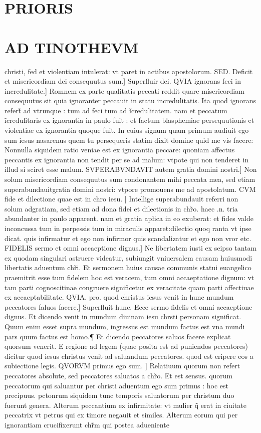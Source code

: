 \documentclass{article}
\begin{document}
\begin{pages}
\section*{PRIORIS }
\section*{AD TINOTHEVM }\pstart christi, fed et violentiam intulerat: vt paret in actibus apostolorum. SED. Deficit et misericordiam dei consequutus sum.] Superfluir dei. QVIA ignorans feci in incredulitate.] Romnem ex parte qualitatis peccati reddit quare misericordiam consequutus sit  quia ignoranter peccauit in statu incredulitatis. Ita quod ignorans refert̃ ad vtrunque  : tum ad feci tum ad ĩcredulitatem. nam et peccatum ĩcredulitaris ex ignorantia in paulo fuit : et factum blasphemiae  persequutionis et violentiae ex ignorantia quoque  fuit. In cuius signum quam primum audiuit ego sum iesus nasarenus quem tu persequeris  statim dixit domine quid me vis facere: Nonnulla siquidem ratio veniae est ex ignorantia peccare: quoniam affectus peccantis ex ignorantia  non tendit per se ad malum: vtpote qui non tenderet in illud si sciret esse malum. SVPERABVNDAVIT autem gratia domini nostri.] Non solum misericordiam consequutus sum condonantem mihi peccata mea, sed etiam superabundauitgratia domini nostri: vtpore promouens me ad apostolatum. CVM fide et dilectione quae est in chro iesu. ] Intellige superabundauit  referri non solum adgratiam, sed etiam ad dona fidei et dilectionis in chr̃o. haec .n. tria abundanter in paulo apparent. nam et gratia apłica in eo exuberat: et fides valde inconcussa tum in perpessis tum in miraculis apparet:dilectio quoq ranta vt ipse dicat. quis infirmatur et ego non infirmor  quis scandalizatur et ego non vror etc.   \pend\pstart FIDELIS sermo et omni accaeptione dignus.] Ne libertatem iusti ex seipso tantam ex quodam singulari astruere videatur, subiungit vniuersalem causam huiusmodi libertatis  aduentum chr̃i. Et sermonem huius causae communis statui euangelico praemitrit esse tum fidelem  hoc est veracem, tum omni accaeptatione dignum: vt tam parti cognoscitinae congruere significetur ex veracitate  quam parti affectiuae ex accaeptabilitate. QVIA. pro. quod  christus iesus venit in hunc mundum peccatores faluos facere.] Superfluit hunc. Ecce sermo fidelis et omni accaeptione dignus. Et dicendo venit in mundum  diuinam iesu chrsti personam significat. Quum enim esset supra mundum, ingressus est mundum  factus est vna mundi pars quum factus est homo.¶ Et dicendo peccatores saluos facere  explicat quorsum venerit. E regione ad legem (quae posita est ad puniendos peccatores) dicitur quod iesus christus venit ad saluandum peccatores. quod est eripere eos a subiectione legis. QVORVM primus ego sum. ] Relatiuum quorum  non refert peccatores absolute, sed peccatores saluatos a chr̃o. Et est sensus. quorum peccatorum qui saluantur per christi aduentum ego sum primus : hoc est precipuus. pctonrum siquidem tunc temporis saluatorum per christum  duo fuerunt genera. Alterum peccantium ex infirmitate: vt mulier q̃ erat in ciuitate peccatrix  vt petrus qui ex timore negauit et similes. Alterum eorum qui per ignorantiam crucifixerunt chr̃m  qui postea adueniente 
\end{pages}
\end{document}
